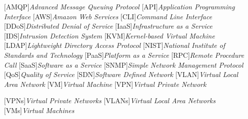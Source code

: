 \begin{acronym}[]
	[AMQP]{{\it Advanced Message Queuing Protocol}}
	[API]{{\it Application Programming Interface}}
    [AWS]{{\it Amazon Web Services}}
	[CLI]{{\it Command Line Interface}}
	[DDoS]{{\it Distributed Denial of Service}}
	[IaaS]{{\it Infrastructure as a Service}}
    [IDS]{{\it Intrusion Detection System}}
	[KVM]{{\it Kernel-based Virtual Machine}}
    [LDAP]{{\it Lightweight Directory Access Protocol}}
	[NIST]{{\it National Institute of Standards and Technology}}
	[PaaS]{{\it Platform as a Service}}
    [RPC]{{\it Remote Procedure Call}}
	[SaaS]{{\it Software as a Service}}
	[SNMP]{{\it Simple Network Management Protocol}}
	[QoS]{{\it Quality of Service}}
	[SDN]{{\it Software Defined Network}}
	[VLAN]{{\it Virtual Local Area Network}}
	[VM]{{\it Virtual Machine}}
	[VPN]{{\it Virtual Private Network}}
	
	[VPNs]{{\it Virtual Private Networks}}
	[VLANs]{{\it Virtual Local Area Networks}}
	[VMs]{{\it Virtual Machines}}
\end{acronym}


